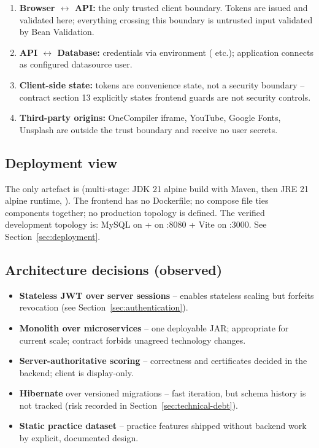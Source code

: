 \begin{enumerate}
    \item \textbf{Browser $\leftrightarrow$ API:} the only trusted client boundary. Tokens are issued and validated here; everything crossing this boundary is untrusted input validated by Bean Validation.
    \item \textbf{API $\leftrightarrow$ Database:} credentials via environment ( etc.); application connects as configured datasource user.
    \item \textbf{Client-side state:}  tokens are convenience state, not a security boundary -- contract section 13 explicitly states frontend guards are not security controls.
    \item \textbf{Third-party origins:} OneCompiler iframe, YouTube, Google Fonts, Unsplash are outside the trust boundary and receive no user secrets.
\end{enumerate}

\subsection{Deployment view}

The only artefact is  (multi-stage: JDK 21 alpine build with Maven, then JRE 21 alpine runtime, ). The frontend has no Dockerfile; no compose file ties components together; no production topology is defined. The verified development topology is: MySQL on  +  on :8080 + Vite on :3000. See Section~\ref{sec:deployment}.

\subsection{Architecture decisions (observed)}

\begin{itemize}
    \item \textbf{Stateless JWT over server sessions} -- enables stateless scaling but forfeits revocation (see Section~\ref{sec:authentication}).
    \item \textbf{Monolith over microservices} -- one deployable JAR; appropriate for current scale; contract forbids unagreed technology changes.
    \item \textbf{Server-authoritative scoring} -- correctness and certificates decided in the backend; client is display-only.
    \item \textbf{Hibernate } over versioned migrations -- fast iteration, but schema history is not tracked (risk recorded in Section~\ref{sec:technical-debt}).
    \item \textbf{Static practice dataset} -- practice features shipped without backend work by explicit, documented design.
\end{itemize}
